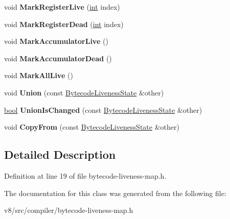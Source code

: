 \begin{DoxyCompactItemize}
void {\bfseries Mark\+Register\+Live} (\mbox{\hyperlink{classint}{int}} index)
\item 
\mbox{\label{classv8_1_1internal_1_1compiler_1_1BytecodeLivenessState_ad6f4861c71b19f5b4256d76ee7073142}} 
void {\bfseries Mark\+Register\+Dead} (\mbox{\hyperlink{classint}{int}} index)
\item 
\mbox{\label{classv8_1_1internal_1_1compiler_1_1BytecodeLivenessState_a32f84d132bb100d0647533c4b5502a72}} 
void {\bfseries Mark\+Accumulator\+Live} ()
\item 
\mbox{\label{classv8_1_1internal_1_1compiler_1_1BytecodeLivenessState_ae999aa0b447e1d7b95a362b79b080864}} 
void {\bfseries Mark\+Accumulator\+Dead} ()
\item 
\mbox{\label{classv8_1_1internal_1_1compiler_1_1BytecodeLivenessState_a09361674684a68430d15f8d8898c7d8a}} 
void {\bfseries Mark\+All\+Live} ()
\item 
\mbox{\label{classv8_1_1internal_1_1compiler_1_1BytecodeLivenessState_a105809b878f191ad50aede7c368c71c9}} 
void {\bfseries Union} (const \mbox{\hyperlink{classv8_1_1internal_1_1compiler_1_1BytecodeLivenessState}{Bytecode\+Liveness\+State}} \&other)
\item 
\mbox{\label{classv8_1_1internal_1_1compiler_1_1BytecodeLivenessState_abea25c41c5a5695336ec07eb5ac0338a}} 
\mbox{\hyperlink{classbool}{bool}} {\bfseries Union\+Is\+Changed} (const \mbox{\hyperlink{classv8_1_1internal_1_1compiler_1_1BytecodeLivenessState}{Bytecode\+Liveness\+State}} \&other)
\item 
\mbox{\label{classv8_1_1internal_1_1compiler_1_1BytecodeLivenessState_a01bdc0996f3dc7eb19bac191f5c2bfc6}} 
void {\bfseries Copy\+From} (const \mbox{\hyperlink{classv8_1_1internal_1_1compiler_1_1BytecodeLivenessState}{Bytecode\+Liveness\+State}} \&other)
\end{DoxyCompactItemize}


\subsection{Detailed Description}


Definition at line 19 of file bytecode-\/liveness-\/map.\+h.



The documentation for this class was generated from the following file\+:\begin{DoxyCompactItemize}
\item 
v8/src/compiler/bytecode-\/liveness-\/map.\+h\end{DoxyCompactItemize}
